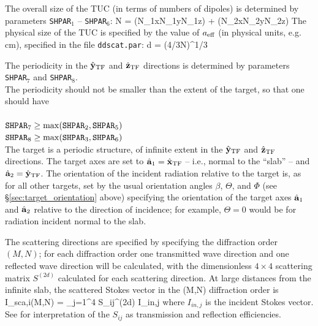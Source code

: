 	The overall size of the TUC (in terms of numbers of
	dipoles) is determined by parameters
	{\tt SHPAR}$_1$ -- {\tt SHPAR}$_6$: 
\beq
N = \left(N_{1x}\times N_{1y}\times N_{1z}\right)
    + \left(N_{2x}\times N_{2y}\times N_{2z}\right)
\eeq
	The physical size of the TUC is specified by the value of
	${a}_{\rm eff}$ (in physical units, e.g. cm), 
	specified in the file {\tt ddscat.par}:
\beq
d = (4\pi/3N)^{1/3}\aeff
\eeq

	The periodicity in the $\hat{\bf y}_{\rm TF}$ and $\hat{\bf z}_{\rm TF}$ directions is determined
	by parameters {\tt SHPAR}$_7$ and {\tt SHPAR}$_8$.\\
        The periodicity should not be smaller than the extent of the
        target, so that one should have\\
        \ \\
        ${\tt SHPAR}_7 \geq {\rm max}({\tt SHPAR}_2,{\tt SHPAR}_5)$\\
        ${\tt SHPAR}_8 \geq {\rm max}({\tt SHPAR}_3,{\tt SHPAR}_6)$\\


	The target
	is a periodic structure, of infinite extent in the $\hat{\bf y}_{\rm TF}$ and
	$\hat{\bf z}_{\rm TF}$ directions.
	The target axes  
	are set to ${\hat{\bf a}}_1 = \hat{\bf x}_{\rm TF}$ --
	i.e., normal to the ``slab'' -- and
	${\hat{\bf a}}_2 = \hat{\bf y}_{\rm TF}$.
	The orientation of the incident radiation relative to the target
	is, as for all other targets, set by the usual orientation
	angles $\beta$, $\Theta$, and $\Phi$ 
	(see \S\ref{sec:target_orientation} above)
	specifying the orientation of the target axes ${\hat{\bf a}}_1$
	and  ${\hat{\bf a}}_2$ relative to the direction of incidence; 
	for example,
	$\Theta=0$ would be for radiation incident normal to the slab.

	The scattering directions are specified by specifying the
	diffraction order $(M,N)$; for each diffraction order one
	transmitted wave direction and one reflected wave direction
	will be calculated, with the dimensionless $4\times4$ scattering
	matrix $S^{(2d)}$ calculated for each scattering direction.
	At large distances from the infinite slab, the
	scattered Stokes vector in the (M,N) diffraction order is
\beq
        I_{sca,i}(M,N) = \sum_{j=1}^{4} S_{ij}^{(2d)} I_{in,j}
\eeq
where $I_{in,j}$ is the incident Stokes vector.  See
\citet{Draine+Flatau_2008a} for interpretation of the $S_{ij}$ as
transmission and reflection efficiencies.
